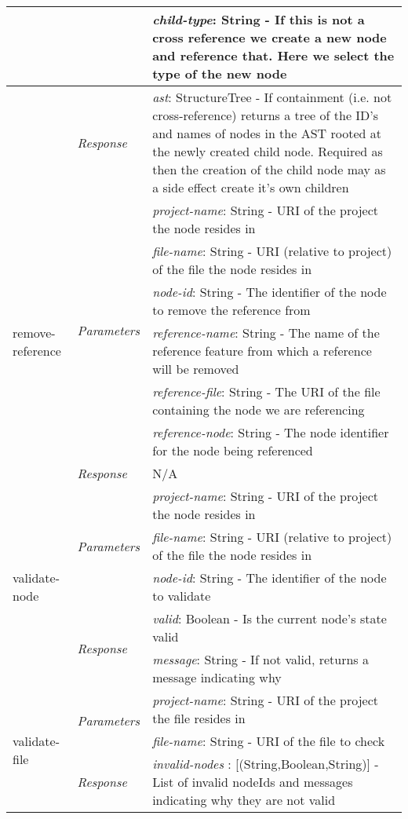 \begin{table}[h!]
\centering
\begin{tabular}{| m{2.5cm}| m{2.3cm} | m{10.2cm} |}
\hline

 & & \emph{child-type}: String - If this is not a cross reference we create a new node and reference that. Here we select the type of the new node\\ \hline
& \multirow{1}{*}{\emph{Response}} 
   & \emph{ast}: StructureTree - If containment (i.e. not cross-reference) returns a tree of the ID's and names of nodes in the AST rooted at the newly created child node. Required as then the creation of the child node may as a side effect create it's own children \\
			 \hline \hline						 

\multirow{7}{*}{remove-reference} & \multirow{6}{*}{\emph{Parameters}} & \emph{project-name}: String - URI of the project the node resides in \\ \cline{3-3}
 & & \emph{file-name}: String -  URI (relative to project) of the file the node resides in \\ \cline{3-3}
 & & \emph{node-id}: String -  The identifier of the node to remove the reference from \\ \cline{3-3}
 & & \emph{reference-name}: String - The name of the reference feature from which a reference will be removed \\ \cline{3-3}
 & & \emph{reference-file}: String - The URI of the file containing the node we are referencing \\ \cline{3-3}
 & & \emph{reference-node}: String - The node identifier for the node being referenced \\ \cline{2-3}
			& \multirow{1}{*}{\emph{Response}} & N/A \\
			 \hline \hline
			 
\multirow{5}{*}{validate-node} & \multirow{3}{*}{\emph{Parameters}} & \emph{project-name}: String - URI of the project the node resides in \\ \cline{3-3}
 & & \emph{file-name}: String -  URI (relative to project) of the file the node resides in \\ \cline{3-3}
 & & \emph{node-id}: String -  The identifier of the node to validate \\ \cline{2-3}
			& \multirow{2}{*}{\emph{Response}} &  \emph{valid}: Boolean - Is the current node's state valid \\ \cline{3-3} 
 & & \emph{message}: String - If not valid, returns a message indicating why \\ \cline{2-3}
			 \hline \hline

\multirow{3}{*}{validate-file} & \multirow{2}{*}{\emph{Parameters}} & \emph{project-name}: String - URI of the project the file resides in \\ \cline{3-3}
 & & \emph{file-name}: String - URI of the file to check\\ \cline{2-3}
			& \multirow{1}{*}{\emph{Response}} & \emph{invalid-nodes} : [(String,Boolean,String)] - List of invalid nodeIds and messages indicating why they are not valid \\
			 \hline 
\end{tabular}
\end{table}

